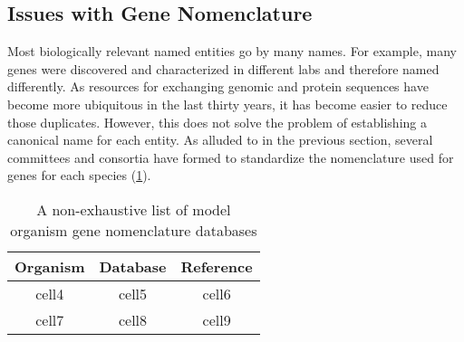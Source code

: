 \subsection{Issues with Gene Nomenclature}

Most biologically relevant named entities go by many names.
For example, many genes were discovered and characterized in different labs and therefore named differently.
As resources for exchanging genomic and protein sequences have become more ubiquitous in the last thirty years, it has become easier to reduce those duplicates.
However, this does not solve the problem of establishing a canonical name for each entity.
As alluded to in the previous section, several committees and consortia have formed to standardize the nomenclature used for genes for each species (\ref{table:gene_nomenclature_databases}).

\begin{table}
    \centering
    \begin{tabular}{ c c c }
        Organism & Database & Reference \\
        \hline
        cell4 & cell5 & cell6 \\
        cell7 & cell8 & cell9
    \end{tabular}
    \caption{A non-exhaustive list of model organism gene nomenclature databases}
    \label{table:gene_nomenclature_databases}
\end{table}
